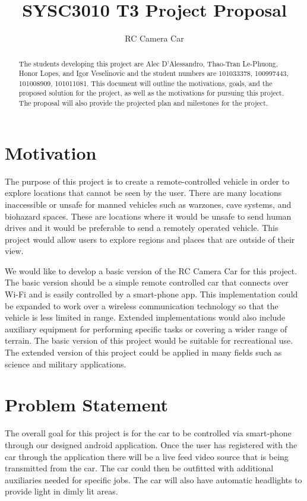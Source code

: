 \documentclass[letterpaper,12pt]{report}
\begin{document}
	\title{SYSC3010 T3 Project Proposal}
	\author{RC Camera Car}
	\date{}
	\maketitle

	\begin{abstract}
		The students developing this project are Alec D'Alessandro, Thao-Tran
		Le-Phuong, Honor Lopes, and Igor Veselinovic and the student numbers are
		101033378, 100997443, 101008909, 101011081. This document will outline
		the motivations, goals, and the proposed solution for the project, as
		well as the motivations for pursuing this project. The proposal will
		also provide the projected plan and milestones for the project.
	\end{abstract}

	\tableofcontents

	\pagebreak

	\section*{Motivation}
	\markright{}
	The purpose of this project is to create a remote-controlled vehicle in 
	order to explore locations that cannot be seen by the user. There are many
	locations inaccessible or unsafe for manned vehicles such as warzones, cave
	systems, and biohazard spaces. These are locations where it would be unsafe
	to send human drives and it would be preferable to send a remotely operated
	vehicle. This project would allow users to explore regions and places that
	are outside of their view.

	We would like to develop a basic version of the RC Camera Car for this
	project. The basic version should be a simple remote controlled car that
	connects over Wi-Fi and is easily controlled by a smart-phone app. This
	implementation could be expanded to work over a wireless communication
	technology so that the vehicle is less limited in range. Extended
	implementations would also include auxiliary equipment for performing 
	specific tasks or covering a wider range of terrain. The basic version of 
	this project would be suitable for recreational use. The extended version of
	this project could be applied in many fields such as science and military 
	applications.


	\section*{Problem Statement}
	\markright{}
	The overall goal for this project is for the car to be controlled via
	smart-phone through our designed android application. Once the user has
	registered with the car through the application there will be a live feed
	video source that is being transmitted from the car. The car could then be
	outfitted with additional auxiliaries needed for specific jobs. The car will
	also have automatic headlights to provide light in dimly lit areas.
\end{document}

